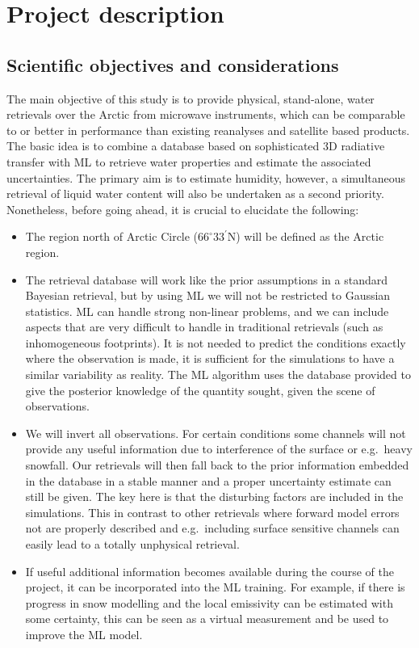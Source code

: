 \documentclass[12pt,oneside,a4paper]{article}
\begin{document}
\section{Project description}
%
\subsection{Scientific objectives and considerations}
The main objective of this study is to provide physical, stand-alone, water
retrievals over the Arctic from microwave instruments, which can be comparable
to or better in performance than existing reanalyses and satellite based
products. The basic idea is to combine a database based on sophisticated 3D
radiative transfer with ML to retrieve water properties and estimate the
associated uncertainties. The primary aim is to estimate humidity, however, a
simultaneous retrieval of liquid water content will also be undertaken as a
second priority. Nonetheless, before going ahead, it is crucial to elucidate
the following:
\begin{itemize}
 \vspace{-1ex}
\item The region north of Arctic Circle ($66^{\circ}33^{'}$N) will be defined
  as the Arctic region.
 \vspace{-1ex}
\item The retrieval database will work like the prior assumptions in a standard
  Bayesian retrieval, but by using ML we will not be restricted to Gaussian
  statistics. ML can handle strong non-linear problems, and we can include
  aspects that are very difficult to handle in traditional retrievals (such as
  inhomogeneous footprints). It is not needed to predict the conditions exactly
  where the observation is made, it is sufficient for the simulations to have a
  similar variability as reality. The ML algorithm uses the database provided
  to give the posterior knowledge of the quantity sought, given the scene of
  observations.
 \vspace{-1ex}
\item We will invert all observations. For certain conditions some channels
  will not provide any useful information due to interference of the surface or
  e.g.\ heavy snowfall. Our retrievals will then fall back to the prior
  information embedded in the database in a stable manner and a proper
  uncertainty estimate can still be given. The key here is that the disturbing
  factors are included in the simulations. This in contrast to other retrievals
  where forward model errors not are properly described and e.g.\ including
  surface sensitive channels can easily lead to a totally unphysical retrieval.
  \vspace{-1ex}
\item If useful additional information becomes available during the course of
  the project, it can be incorporated into the ML training. For example, if
  there is progress in snow modelling and the local emissivity can be estimated
  with some certainty, this can be seen as a virtual measurement and be used to
  improve the ML model.
\end{itemize}
\end{document}
